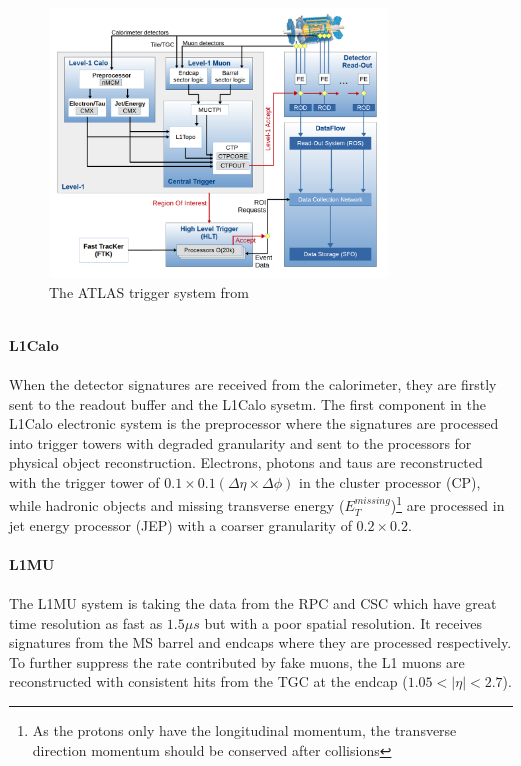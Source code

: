 \begin{figure}[!h]                
	\includegraphics[width=0.8\textwidth]{Chapter2/Trigger.png}
	\centering
	\begin{center}
		\caption{The ATLAS trigger system from \cite{trigger_str}}
		\label{Fig:trigger}            
	\end{center}
\end{figure}
\noindent
\\{\bf L1Calo}
\\
\\When the detector signatures are received from the calorimeter, they are firstly sent to the readout buffer and the L1Calo sysetm. The first component in the L1Calo electronic system is the preprocessor where the signatures are processed into trigger towers with degraded granularity and sent to the processors for physical object reconstruction. Electrons, photons and taus are reconstructed with the trigger tower of $0.1 \times 0.1 (\Delta \eta \times \Delta \phi)$ in the cluster processor (CP), while hadronic objects and missing transverse energy ($E_{T}^{missing}$)\footnote{As the protons only have the longitudinal momentum, the transverse direction momentum should be conserved after collisions} are processed in jet energy processor (JEP) with a coarser granularity of $0.2\times 0.2$.
\\
\\{\bf L1MU}
\\
\\The L1MU system is taking the data from the RPC and CSC which have great time resolution as fast as $1.5\mu s$ but with a poor spatial resolution. It receives signatures from the MS barrel and endcaps where they are processed respectively. To further suppress the rate contributed by fake muons, the L1 muons are reconstructed with consistent hits from the TGC at the endcap ($1.05<|\eta|<2.7$). 
